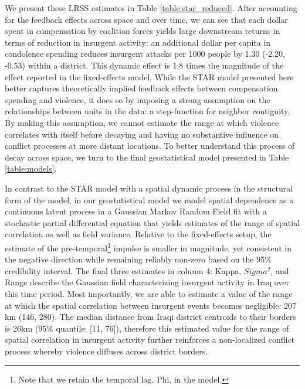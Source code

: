 \documentclass[12pt]{article}
\begin{document}
We present these LRSS estimates in Table \ref{table:star_reduced}. After accounting for the feedback effects across space and over time, we can see that each dollar spent in compensation by coalition forces yields large downstream returns in terms of reduction in insurgent activity: an additional dollar per capita in condolence spending reduces insurgent attacks per 1000 people by 1.30 (-2.20, -0.53) within a district. This dynamic effect is 1.8 times the magnitude of the effect reported in the fixed-effects model. While the STAR model presented here better captures theoretically implied feedback effects between compensation spending and violence, it does so by imposing a strong assumption on the relationships between units in the data: a step-function for neighbor contiguity. By making this assumption, we cannot estimate the range at which violence correlates with itself before decaying and having no substantive influence on conflict processes at more distant locations. To better understand this process of decay across space, we turn to the final geostatistical model presented in Table \ref{table:models}.

In contrast to the STAR model with a spatial dynamic process in the structural form of the model, in our geostatistical model we model spatial dependence as a continuous latent process in a Gaussian Markov Random Field fit with a stochastic partial differential equation that yields estimates of the range of spatial correlation as well as field variance. Relative to the fixed-effects setup, the estimate of the pre-temporal\footnote{Note that we retain the temporal lag, Phi, in the model.} impulse is smaller in magnitude, yet consistent in the negative direction while remaining reliably non-zero based on the 95\% credibility interval. The final three estimates in column 4: Kappa, $Sigma^2$, and Range describe the Gaussian field characterizing insurgent activity in Iraq over this time period. Most importantly, we are able to estimate a value of the range at which the spatial correlation between insurgent events becomes negligible: 207 km (146, 280). The median distance from Iraqi district centroids to their borders is 26km (95\% quantile: [11, 76]), therefore this estimated value for the range of spatial correlation in insurgent activity further reinforces a non-localized conflict process whereby violence diffuses across district borders.
\end{document}

